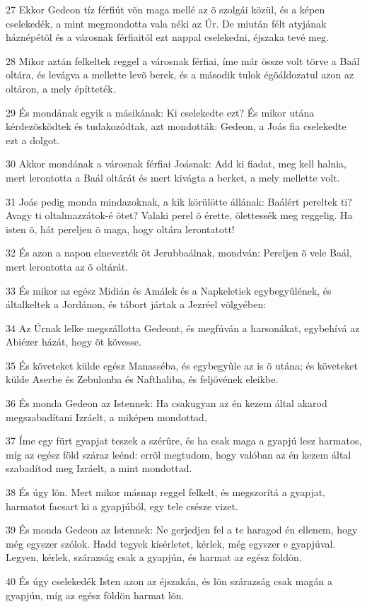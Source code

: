 \par 27 Ekkor Gedeon tíz férfiút võn maga mellé az õ szolgái közül, és a képen cselekedék, a mint megmondotta vala néki az Úr. De miután félt atyjának háznépétõl és a városnak férfiaitól ezt nappal cselekedni, éjszaka tevé meg.
\par 28 Mikor aztán felkeltek reggel a városnak férfiai, íme már össze volt törve a Baál oltára, és levágva a mellette levõ berek, és a második tulok égõáldozatul azon az oltáron, a mely építteték.
\par 29 És mondának egyik a másikának: Ki cselekedte ezt? És mikor utána kérdezõsködtek és tudakozódtak, azt mondották: Gedeon, a Joás fia cselekedte ezt a dolgot.
\par 30 Akkor mondának a városnak férfiai Joásnak: Add ki fiadat, meg kell halnia, mert lerontotta a Baál oltárát és mert kivágta a berket, a mely mellette volt.
\par 31 Joás pedig monda mindazoknak, a kik körülötte állának: Baálért pereltek ti? Avagy ti oltalmazzátok-é õtet? Valaki perel õ érette, ölettessék meg reggelig. Ha isten õ, hát pereljen õ maga, hogy oltára lerontatott!
\par 32 És azon a napon elnevezték õt Jerubbaálnak, mondván: Pereljen õ vele Baál, mert lerontotta az õ oltárát.
\par 33 És mikor az egész Midián és Amálek és a Napkeletiek egybegyûlének, és általkeltek a Jordánon, és tábort jártak a Jezréel völgyében:
\par 34 Az Úrnak lelke megszállotta Gedeont, és megfúván a harsonákat, egybehívá az Abiézer házát, hogy õt kövesse.
\par 35 És követeket külde egész Manasséba, és egybegyûle az is õ utána; és követeket külde Aserbe és Zebulonba és Nafthaliba, és feljövének eleikbe.
\par 36 És monda Gedeon az Istennek: Ha csakugyan az én kezem által akarod megszabadítani Izráelt, a miképen mondottad,
\par 37 Íme egy fürt gyapjat teszek a szérûre, és ha csak maga a gyapjú lesz harmatos, míg az egész föld száraz leénd: errõl megtudom, hogy valóban az én kezem által szabadítod meg Izráelt, a mint mondottad.
\par 38 És úgy lõn. Mert mikor másnap reggel felkelt, és megszorítá a gyapjat, harmatot facsart ki a gyapjúból, egy tele csésze vizet.
\par 39 És monda Gedeon az Istennek: Ne gerjedjen fel a te haragod én ellenem, hogy még egyszer szólok. Hadd tegyek kísérletet, kérlek, még egyszer e gyapjúval. Legyen, kérlek, szárazság csak a gyapjún, és harmat az egész földön.
\par 40 És úgy cselekedék Isten azon az éjszakán, és lõn szárazság csak magán a gyapjún, míg az egész földön harmat lõn.

